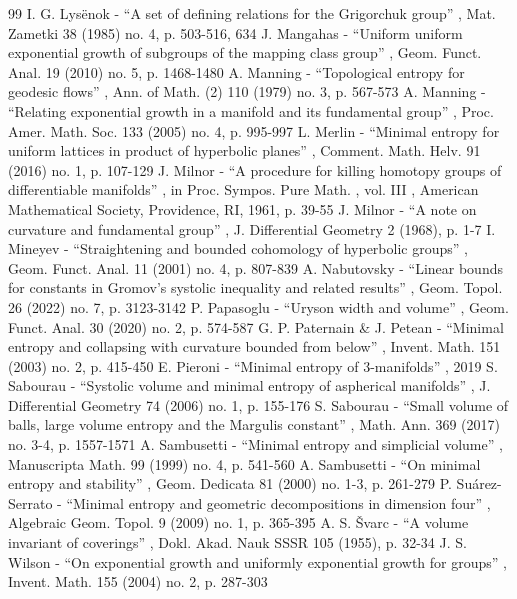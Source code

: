 \documentclass[11pt]{article}
\theoremstyle{definition}
\numberwithin{equation}{section}
\begin{document}
\begin{thebibliography}{99}
 I. G. Lysënok - “A set of defining relations for the Grigorchuk group” , Mat. Zametki 38 (1985) no. 4, p. 503-516, 634
 J. Mangahas - “Uniform uniform exponential growth of subgroups of the mapping class group” , Geom. Funct. Anal. 19 (2010) no. 5, p. 1468-1480
 A. Manning - “Topological entropy for geodesic flows” , Ann. of Math. (2) 110 (1979) no. 3, p. 567-573
 A. Manning - “Relating exponential growth in a manifold and its fundamental group” , Proc. Amer. Math. Soc. 133 (2005) no. 4, p. 995-997
 L. Merlin - “Minimal entropy for uniform lattices in product of hyperbolic planes” , Comment. Math. Helv. 91 (2016) no. 1, p. 107-129
 J. Milnor - “A procedure for killing homotopy groups of differentiable manifolds” , in Proc. Sympos. Pure Math. , vol. III , American Mathematical Society, Providence, RI, 1961, p. 39-55
 J. Milnor - “A note on curvature and fundamental group” , J. Differential Geometry 2 (1968), p. 1-7
 I. Mineyev - “Straightening and bounded cohomology of hyperbolic groups” , Geom. Funct. Anal. 11 (2001) no. 4, p. 807-839
 A. Nabutovsky - “Linear bounds for constants in Gromov’s systolic inequality and related results” , Geom. Topol. 26 (2022) no. 7, p. 3123-3142
 P. Papasoglu - “Uryson width and volume” , Geom. Funct. Anal. 30 (2020) no. 2, p. 574-587
 G. P. Paternain \& J. Petean - “Minimal entropy and collapsing with curvature bounded from below” , Invent. Math. 151 (2003) no. 2, p. 415-450
 E. Pieroni - “Minimal entropy of $3$-manifolds” , 2019
 S. Sabourau - “Systolic volume and minimal entropy of aspherical manifolds” , J. Differential Geometry 74 (2006) no. 1, p. 155-176
 S. Sabourau - “Small volume of balls, large volume entropy and the Margulis constant” , Math. Ann. 369 (2017) no. 3-4, p. 1557-1571
 A. Sambusetti - “Minimal entropy and simplicial volume” , Manuscripta Math. 99 (1999) no. 4, p. 541-560
 A. Sambusetti - “On minimal entropy and stability” , Geom. Dedicata 81 (2000) no. 1-3, p. 261-279
 P. Suárez-Serrato - “Minimal entropy and geometric decompositions in dimension four” , Algebraic Geom. Topol. 9 (2009) no. 1, p. 365-395
 A. S. Švarc - “A volume invariant of coverings” , Dokl. Akad. Nauk SSSR 105 (1955), p. 32-34
 J. S. Wilson - “On exponential growth and uniformly exponential growth for groups” , Invent. Math. 155 (2004) no. 2, p. 287-303
\end{thebibliography}
\end{document}
